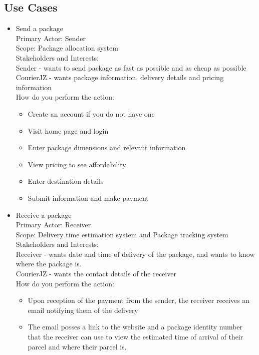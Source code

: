 \documentclass[paper=a4, fontsize=11pt]{scrartcl} %
\numberwithin{equation}{section} %
\numberwithin{figure}{section} %
\numberwithin{table}{section} %
\begin{document}
  

\subsection{Use Cases}
\begin{itemize}
\item Send a package \\
Primary Actor: \quad \quad Sender \\
Scope:		\quad \quad	 Package allocation system \\
Stakeholders and Interests: \\
Sender - wants to send package as fast as possible and as cheap as possible \\
CourierJZ - wants package information, delivery details and pricing information \\
How do you perform the action: \\
\begin{itemize}
\item Create an account if you do not have one
\item Visit home page and login
\item Enter package dimensions and relevant information
\item View pricing to see affordability
\item Enter destination details
\item Submit information and make payment
\end{itemize}

\item Receive a package\\

Primary Actor: \quad \quad Receiver \\
Scope:		\quad \quad	Delivery time estimation system and Package tracking system  \\
Stakeholders and Interests: \\
Receiver - wants date and time of delivery of the package, and wants to know where the package is. \\
CourierJZ - wants the contact details of the receiver \\
How do you perform the action: \\
\begin{itemize}
\item Upon reception of the payment from the sender, the receiver receives an email notifying them of the delivery
\item The email posses a link to the website and a package identity number that the receiver can use to view the estimated time of arrival of their parcel and where their parcel is.


\end{itemize}
\end{itemize}
\end{document}
